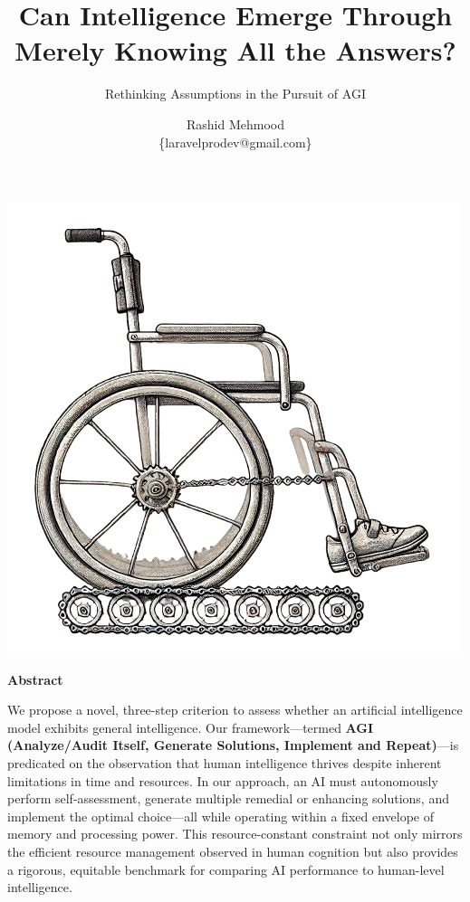 \documentclass[11pt]{scrartcl}
\begin{document}
\title{Can Intelligence Emerge Through Merely Knowing All the Answers?}
\subtitle{Rethinking Assumptions in the Pursuit of AGI}
\author{Rashid Mehmood \\ \{laravelprodev@gmail.com\} }

\maketitle

\includegraphics[scale=0.6, center]{title_wheelchair.png}

\vspace{2cm}

\begin{center}
\begin{Huge}
\textbf{Abstract}
\end{Huge}
\end{center}

We propose a novel, three-step criterion to assess whether an artificial intelligence model exhibits general intelligence. Our framework—termed \textbf{AGI (Analyze/Audit Itself, Generate Solutions, Implement and Repeat)}—is predicated on the observation that human intelligence thrives despite inherent limitations in time and resources. In our approach, an AI must autonomously perform self-assessment, generate multiple remedial or enhancing solutions, and implement the optimal choice—all while operating within a fixed envelope of memory and processing power. This resource-constant constraint not only mirrors the efficient resource management observed in human cognition but also provides a rigorous, equitable benchmark for comparing AI performance to human-level intelligence.\\
\end{document}

